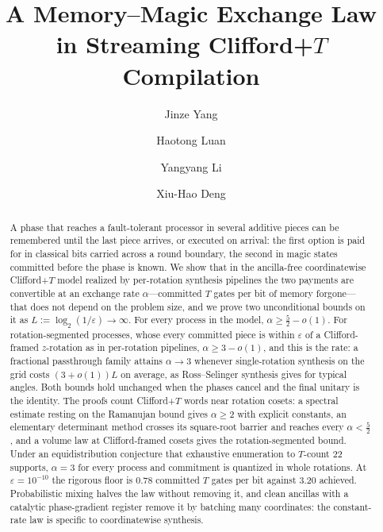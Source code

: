\documentclass[aps,prx,twocolumn,superscriptaddress,nofootinbib,longbibliography]{revtex4-2}
\theoremstyle{plain}
\theoremstyle{definition}
\theoremstyle{remark}
\begin{document}
\title{A Memory--Magic Exchange Law in Streaming \texorpdfstring{Clifford+$T$}{Clifford+T} Compilation}

\author{Jinze Yang}

\author{Haotong Luan}

\author{Yangyang Li}

\author{Xiu-Hao Deng}

\begin{abstract}
A phase that reaches a fault-tolerant processor in several additive pieces can be remembered until the last piece arrives, or executed on arrival: the first option is paid for in classical bits carried across a round boundary, the second in magic states committed before the phase is known. We show that in the ancilla-free coordinatewise Clifford+$T$ model realized by per-rotation synthesis pipelines the two payments are convertible at an exchange rate $\alpha$---committed $T$ gates per bit of memory forgone---that does not depend on the problem size, and we prove two unconditional bounds on it as $L:=\log_2(1/\varepsilon)\to\infty$. For every process in the model, $\alpha\ge\tfrac52-o(1)$. For rotation-segmented processes, whose every committed piece is within $\varepsilon$ of a Clifford-framed $z$-rotation as in per-rotation pipelines, $\alpha\ge3-o(1)$, and this is the rate: a fractional passthrough family attains $\alpha\to3$ whenever single-rotation synthesis on the grid costs $(3+o(1))L$ on average, as Ross--Selinger synthesis gives for typical angles. Both bounds hold unchanged when the phases cancel and the final unitary is the identity. The proofs count Clifford+$T$ words near rotation cosets: a spectral estimate resting on the Ramanujan bound gives $\alpha\ge2$ with explicit constants, an elementary determinant method crosses its square-root barrier and reaches every $\alpha<\tfrac52$, and a volume law at Clifford-framed cosets gives the rotation-segmented bound. Under an equidistribution conjecture that exhaustive enumeration to $T$-count $22$ supports, $\alpha=3$ for every process and commitment is quantized in whole rotations. At $\varepsilon=10^{-10}$ the rigorous floor is $0.78$ committed $T$ gates per bit against $3.20$ achieved. Probabilistic mixing halves the law without removing it, and clean ancillas with a catalytic phase-gradient register remove it by batching many coordinates: the constant-rate law is specific to coordinatewise synthesis.
\end{abstract}
\end{document}
